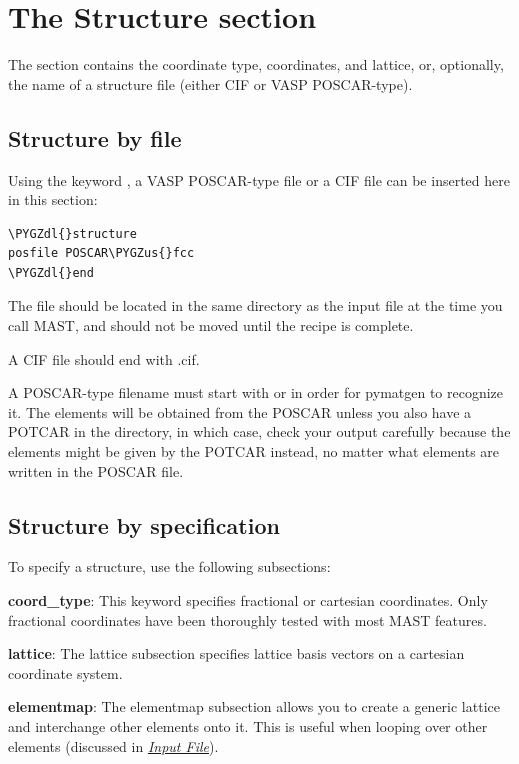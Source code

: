 \documentclass[letterpaper,10pt,english]{sphinxmanual}
\def\PYGZus{\char`\_}
\def\PYGZdl{\char`\$}
\begin{document}
\section{The Structure section}
\label{3_1_1_structure:the-structure-section}\label{3_1_1_structure::doc}
The  section contains the coordinate type, coordinates, and lattice, or, optionally, the name of a structure file (either CIF or VASP POSCAR-type).


\subsection{Structure by file}
\label{3_1_1_structure:structure-by-file}
Using the keyword , a VASP POSCAR-type file or a CIF file can be inserted here in this section:

\begin{Verbatim}[commandchars=\\\{\}]
\PYGZdl{}structure
posfile POSCAR\PYGZus{}fcc
\PYGZdl{}end
\end{Verbatim}

The file should be located in the same directory as the input file at the time you call MAST, and should not be moved until the recipe is complete.

A CIF file should end with .cif.

A POSCAR-type filename must start with  or  in order for pymatgen to recognize it. The elements will be obtained from the POSCAR unless you also have a POTCAR in the directory, in which case, check your output carefully because the elements might be given by the POTCAR instead, no matter what elements are written in the POSCAR file.


\subsection{Structure by specification}
\label{3_1_1_structure:structure-by-specification}
To specify a structure, use the following subsections:

\textbf{coord\_type}: This keyword specifies fractional or cartesian coordinates. Only fractional coordinates have been thoroughly tested with most MAST features.

\textbf{lattice}: The lattice subsection specifies lattice basis vectors on a cartesian coordinate system.

\textbf{elementmap}: The elementmap subsection allows you to create a generic lattice and interchange other elements onto it. This is useful when looping over other elements (discussed in {\hyperref[3_0_inputfile::doc]{\emph{Input File}}}).
\end{document}
